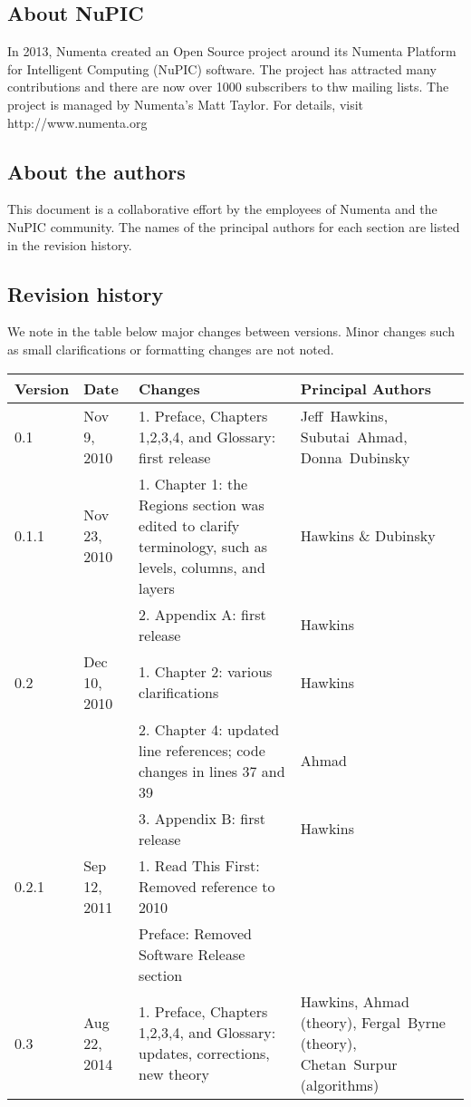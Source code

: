 \subsection*{About NuPIC}

In 2013, Numenta created an Open Source project around its Numenta Platform
for Intelligent Computing (NuPIC) software. The project has attracted many contributions
and there are now over 1000 subscribers to thw mailing lists. The project is managed
by Numenta's Matt Taylor. For details, visit http://www.numenta.org

\subsection*{About the authors}

This document is a collaborative effort by the employees of
Numenta and the NuPIC community. The names of the principal authors for each section are
listed in the revision history.

\pagebreak
\subsection*{Revision history}

We note in the table below major changes between versions. Minor
changes such as small clarifications or formatting changes are not
noted.

\vspace{5mm}
\begin{tabular}{|p{}|p{}|>{\raggedright}p{}|>{\raggedright\arraybackslash}p{}|}
\hline
Version & Date & Changes & Principal Authors \\
\hline
0.1 & Nov 9, 2010 & 1. Preface, Chapters 1,2,3,4, and Glossary: first release & Jeff~Hawkins, Subutai~Ahmad, Donna~Dubinsky \\
\hline
0.1.1 & Nov 23, 2010 & 1. Chapter 1: the Regions section was edited to clarify terminology, such as levels, columns, and layers & Hawkins \& Dubinsky \\
 & & 2. Appendix A: first release & Hawkins \\
\hline
0.2 & Dec 10, 2010 & 1. Chapter 2: various clarifications & Hawkins \\
 & & 2. Chapter 4: updated line references; code changes in lines 37 and 39 & Ahmad \\
 & & 3. Appendix B: first release & Hawkins \\
\hline
0.2.1 & Sep 12, 2011 & 1. Read This First: Removed reference to 2010 & \\
 & & Preface: Removed Software Release section & \\
\hline
0.3 & Aug 22, 2014 & 1. Preface, Chapters 1,2,3,4, and Glossary: updates, corrections, new theory & 
Hawkins, Ahmad (theory), Fergal~Byrne (theory), Chetan~Surpur (algorithms)\\
\hline
\end{tabular}
